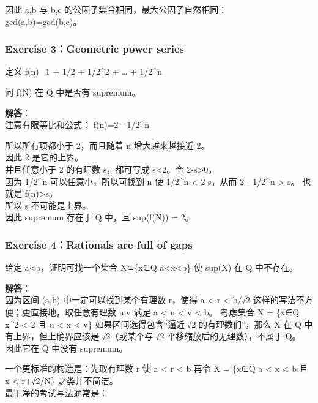 \documentclass[
  11pt,
]{article}
\begin{document}
因此 a,b 与 b,c 的公因子集合相同，最大公因子自然相同：\\
gcd(a,b)=gcd(b,c)。

\subsubsection{Exercise 3：Geometric power
series}\label{exercise-3geometric-power-series}

定义 f(n)=1 + 1/2 + 1/2\^{}2 + \ldots{} + 1/2\^{}n

问 f(N) 在 Q 中是否有 supremum。

\textbf{解答}：\\
注意有限等比和公式： f(n)=2 - 1/2\^{}n

所以所有项都小于 2，而且随着 n 增大越来越接近 2。\\
因此 2 是它的上界。\\
并且任意小于 2 的有理数 s，都可写成 s\textless2。令 2-s\textgreater0。\\
因为 1/2\^{}n 可以任意小，所以可找到 n 使 1/2\^{}n \textless{} 2-s，从而
2 - 1/2\^{}n \textgreater{} s。 也就是 f(n)\textgreater s。\\
所以 s 不可能是上界。\\
因此 supremum 存在于 Q 中，且 sup(f(N)) = 2。

\subsubsection{Exercise 4：Rationals are full of
gaps}\label{exercise-4rationals-are-full-of-gaps}

给定 a\textless b，证明可找一个集合 X⊂\{x∈Q \textbar{}
a\textless x\textless b\} 使 sup(X) 在 Q 中不存在。

\textbf{解答}：\\
因为区间 (a,b) 中一定可以找到某个有理数 r，使得 a \textless{} r
\textless{} b/√2 这样的写法不方便；更直接地，取任意有理数 u,v 满足 a
\textless{} u \textless{} v \textless{} b。 考虑集合 X = \{x∈Q
\textbar{} x\^{}2 \textless{} 2 且 u \textless{} x \textless{} v\}
如果区间选得包含``逼近 √2 的有理数们''，那么 X 在 Q
中有上界，但上确界应该是 √2（或某个与 √2 平移缩放后的无理数），不属于
Q。\\
因此它在 Q 中没有 supremum。

一个更标准的构造是：先取有理数 r 使 a \textless{} r \textless{} b 再令 X
= \{x∈Q \textbar{} a \textless{} x \textless{} b 且 x \textless{}
r+√2/N\} 之类并不简洁。\\
最干净的考试写法通常是：
\end{document}
